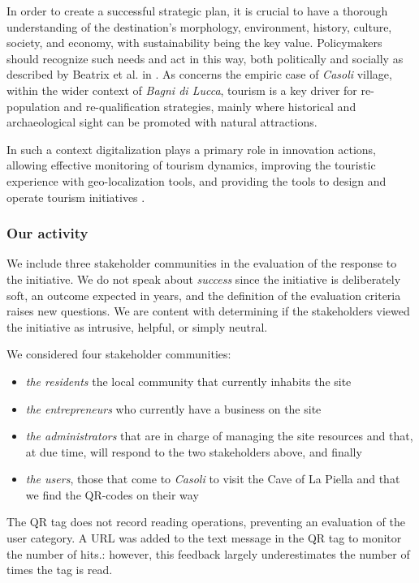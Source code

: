\documentclass[sustainability,article,submit,pdftex,moreauthors]{Definitions/mdpi}
\begin{document}
In order to create a successful strategic plan, it is crucial to have a thorough understanding of the destination's morphology, environment, history, culture, society, and economy, with sustainability being the key value.
Policymakers should recognize such needs and act in this way, both politically and socially as described by Beatrix et al. in \cite{bea10}. As concerns the empiric case of \emph{Casoli} village, within the wider context of \emph{Bagni di Lucca}, tourism is a key driver for re-population and re-qualification strategies, mainly where historical and archaeological sight can be promoted with natural attractions.

In such a context digitalization plays a primary role in innovation actions, allowing effective monitoring of tourism dynamics, improving the touristic experience with geo-localization tools, and providing the tools to design and operate tourism initiatives \cite{lem22}.

\subsubsection{Our activity}

We include three stakeholder communities in the evaluation of the response to the initiative. We do not speak about {\em success} since the initiative is deliberately soft, an outcome expected in years, and the definition of the evaluation criteria raises new questions. We are content with determining if the stakeholders viewed the initiative as intrusive, helpful, or simply neutral.

We considered four stakeholder communities:

\begin{itemize}
	\item {\em the residents} the local community that currently inhabits the site
	\item {\em the entrepreneurs} who currently have a business on the site
	\item {\em the administrators} that are in charge of managing the site resources and that, at due time, will respond to the two stakeholders above, and finally
	\item {\em the users}, those that come to \emph{Casoli} to visit the Cave of La Piella and that we find the QR-codes on their way
\end{itemize}

The QR tag does not record reading operations, preventing an evaluation of the user category. A URL was added to the text message in the QR tag to monitor the number of hits.: however, this feedback largely underestimates the number of times the tag is read. 
\end{document}
